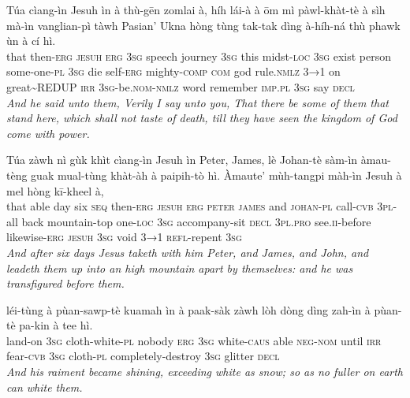 \documentclass[11pt,a4paper]{article}
\begin{document}
\begin{exe}
\gll Túa cìang-ìn Jesuh ìn à thù-gēn zomlai à, híh lái-à à ōm mì pàwl-khàt-tè à sìh mà-ìn vanglian-pì tàwh Pasian' Ukna hòng tùng tak-tak dìng à-híh-ná thù phawk ùn à cí hì. \\
     that then-\textsc{erg} \textsc{jesuh} \textsc{erg} \textsc{3sg} speech journey \textsc{3sg} this midst-\textsc{loc} \textsc{3sg} exist person some-one-\textsc{pl} \textsc{3sg} die self-\textsc{erg} mighty-\textsc{comp} \textsc{com} god rule.\textsc{nmlz} \textsc{3→1} on great\textasciitilde{}REDUP \textsc{irr} \textsc{3sg}-be.\textsc{nom}-\textsc{nmlz} word remember \textsc{imp}.\textsc{pl} \textsc{3sg} say \textsc{decl} \\
\glt \textcolor{kjvcolor}{\textit{And he said unto them, Verily I say unto you, That there be some of them that stand here, which shall not taste of death, till they have seen the kingdom of God come with power.}}

\gll Túa zàwh nì gùk khìt cìang-ìn Jesuh ìn Peter, James, lè Johan-tè sàm-ìn àmau-tèng guak mual-tùng khàt-àh à paipih-tò hì. Àmaute' mùh-tangpi màh-ìn Jesuh à mel hòng kī-kheel à, \\
     that able day six \textsc{seq} then-\textsc{erg} \textsc{jesuh} \textsc{erg} \textsc{peter} \textsc{james} and \textsc{johan}-\textsc{pl} call-\textsc{cvb} \textsc{3pl}-all back mountain-top one-\textsc{loc} \textsc{3sg} accompany-sit \textsc{decl} \textsc{3pl}.\textsc{pro} see.\textsc{ii}-before likewise-\textsc{erg} \textsc{jesuh} \textsc{3sg} void \textsc{3→1} \textsc{refl}-repent \textsc{3sg} \\
\glt \textcolor{kjvcolor}{\textit{And after six days Jesus taketh with him Peter, and James, and John, and leadeth them up into an high mountain apart by themselves: and he was transfigured before them.}}

\gll léi-tùng à pùan-sawp-tè kuamah ìn à paak-sàk zàwh lòh dòng dìng zah-ìn à pùan-tè pa-kin à tee hì. \\
     land-on \textsc{3sg} cloth-white-\textsc{pl} nobody \textsc{erg} \textsc{3sg} white-\textsc{caus} able \textsc{neg}-\textsc{nom} until \textsc{irr} fear-\textsc{cvb} \textsc{3sg} cloth-\textsc{pl} completely-destroy \textsc{3sg} glitter \textsc{decl} \\
\glt \textcolor{kjvcolor}{\textit{And his raiment became shining, exceeding white as snow; so as no fuller on earth can white them.}}


\end{exe}
\end{document}
